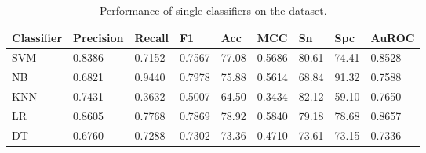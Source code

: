 \begin{table}[h]
\centering
\begin{tabular}{l|p{1.5cm}p{1.2cm}p{1cm}p{1cm}p{1cm}p{1cm}p{1cm}p{1cm}} \hline
\bf Classifier & \bf Precision & \bf Recall & \bf F1 & \bf Acc & \bf MCC & \bf Sn& \bf Spc & %
\bf AuROC \\\hline
SVM & 0.8386 & 0.7152 & 0.7567 & 77.08 &  0.5686 & 80.61 & 74.41 & %
0.8528   \\\hline
NB & 0.6821 & 0.9440 & 0.7978 & 75.88 & 0.5614 & 68.84 & 91.32 & %
0.7588   \\\hline
KNN & 0.7431 & 0.3632 & 0.5007 & 64.50 & 0.3434 & 82.12 & 59.10 & %
0.7650   \\\hline
LR & 0.8605 & 0.7768 & 0.7869 & 78.92 & 0.5840 & 79.18 & 78.68 & %
0.8657  \\\hline
DT & 0.6760 & 0.7288 & 0.7302 & 73.36 & 0.4710 & 73.61 & 73.15 & %
0.7336  \\\hline
\end{tabular}
\caption{Performance of single classifiers on the dataset. \label{tabSingle}}
\end{table}



